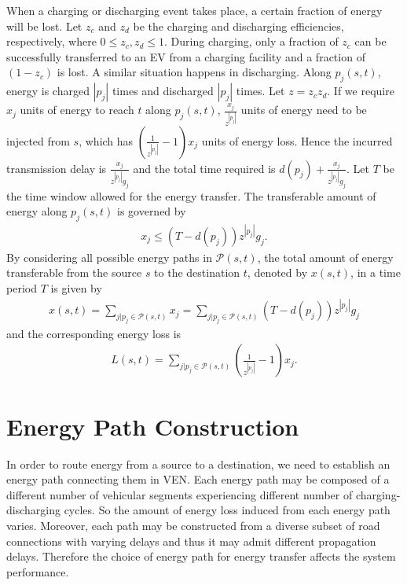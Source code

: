 \documentclass[journal]{IEEEtran}
\begin{document}
When a charging or discharging event takes place, a certain fraction of energy will be lost. Let $z_c$ and $z_d$ be the charging and discharging efficiencies, respectively, where $0\leq z_c, z_d \leq 1$. During charging, only a fraction of $z_c$ can be successfully transferred to an EV from a charging facility and a fraction of $(1-z_c)$ is lost. A similar situation happens in discharging. Along $p_j(s,t)$, energy is charged $|p_j|$ times  and discharged $|p_j|$ times. Let $z=z_cz_d$. If we require $x_j$ units of energy to reach $t$ along $p_j(s,t)$, $\frac{x_j}{z^{|p_j|}}$ units of energy need to be injected from $s$, which has $(\frac{1}{z^{|p_j|}}-1)x_j$ units of energy loss. Hence the incurred transmission delay is $\frac{x_j}{z^{|p_j|}g_j}$ and the total time required is $d(p_j) + \frac{x_j}{z^{|p_j|}g_j}$. Let $T$ be the time window allowed for the energy transfer. The transferable amount of energy along $p_j(s,t)$ is governed by
\begin{align} 
x_j\leq (T-d(p_j)) z^{|p_j|}g_j. \label{transferamount}
\end{align}
 By considering all possible energy paths in $\mathcal{P}(s,t)$, the total amount of energy transferable from the source $s$ to the destination $t$, denoted by $x(s,t)$, in a time period $T$ is given by
\begin{align}
x(s,t) = \sum_{j|p_j\in \mathcal{P}(s,t)}{x_j} = \sum_{j|p_j\in \mathcal{P}(s,t)}{(T-d(p_j)) z^{|p_j|}g_j} \label{totalenergy}
\end{align}
and the corresponding energy loss is
\begin{align}
L(s,t) = \sum_{j|p_j\in \mathcal{P}(s,t)}{(\frac{1}{z^{|p_j|}}-1)x_j}. \label{energyLoss}
\end{align}






\section{Energy Path Construction} \label{sec:wholeset}

In order to route energy from a source to a destination, we need to establish an energy path connecting them  in VEN. Each energy path may be composed of a different number of vehicular segments experiencing different number of charging-discharging cycles.  So the amount of energy loss induced from each energy path varies. Moreover, each path may be constructed from a diverse subset of road connections with varying delays and thus it may admit different propagation delays. Therefore the choice of energy path for energy transfer affects the system performance.
\end{document}
